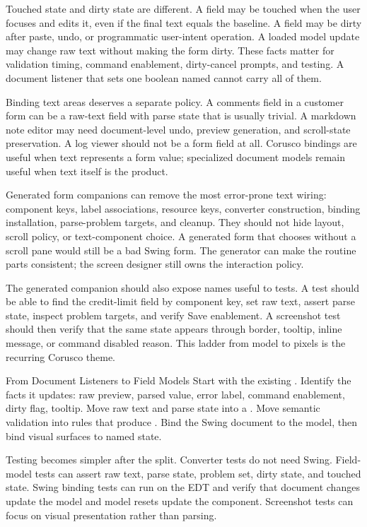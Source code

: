 Touched state and dirty state are different. A field may be touched when the
user focuses and edits it, even if the final text equals the baseline. A field
may be dirty after paste, undo, or programmatic user-intent operation. A loaded
model update may change raw text without making the form dirty. These facts
matter for validation timing, command enablement, dirty-cancel prompts, and
testing. A document listener that sets one boolean named  cannot
carry all of them.

Binding text areas deserves a separate policy. A comments field in a customer
form can be a raw-text field with parse state that is usually trivial. A
markdown note editor may need document-level undo, preview generation, and
scroll-state preservation. A log viewer should not be a form field at all.
Corusco bindings are useful when text represents a form value; specialized
document models remain useful when text itself is the product.

Generated form companions can remove the most error-prone text wiring:
component keys, label associations, resource keys, converter construction,
binding installation, parse-problem targets, and cleanup. They should not hide
layout, scroll policy, or text-component choice. A generated form that chooses
 without a scroll pane would still be a bad Swing form. The
generator can make the routine parts consistent; the screen designer still
owns the interaction policy.

The generated companion should also expose names useful to tests. A test should
be able to find the credit-limit field by component key, set raw text, assert
parse state, inspect problem targets, and verify Save enablement. A screenshot
test should then verify that the same state appears through border, tooltip,
inline message, or command disabled reason. This ladder from model to pixels is
the recurring Corusco theme.

\begin{migrationbox}{From Document Listeners to Field Models}
Start with the existing . Identify the facts it updates: raw preview, parsed value, error label, command enablement, dirty flag, tooltip. Move raw text and parse state into a . Move semantic validation into rules that produce . Bind the Swing document to the model, then bind visual surfaces to named state.
\end{migrationbox}

Testing becomes simpler after the split. Converter tests do not need Swing. Field-model tests can assert raw text, parse state, problem set, dirty state, and touched state. Swing binding tests can run on the EDT and verify that document changes update the model and model resets update the component. Screenshot tests can focus on visual presentation rather than parsing.

